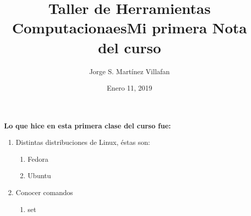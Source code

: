 \documentclass[letterpaper, 12pt, oneside]{article}%
\title{\Huge Taller de Herramientas Computacionaes}
\author{Jorge S. Martínez Villafan}
\date{Enero 11, 2019}
\begin{document}
\maketitle
\newpage
\title{Mi primera Nota del curso}

\textbf{Lo que hice en esta primera clase del curso fue:}
\begin{enumerate}
	\item Distintas distribuciones de Linux, éstas son: 
	\begin{enumerate}
		\item Fedora
		\item Ubuntu
		\end{enumerate}
	\item Conocer comandos
	\begin{enumerate}
		\item \color{red}set 
	\end{enumerate}

\end{enumerate}
\end{document}
